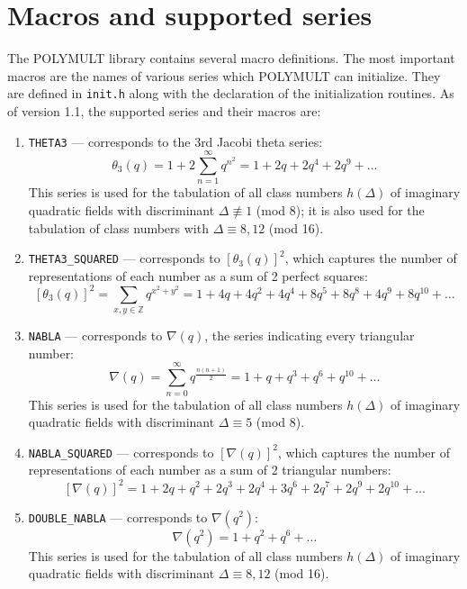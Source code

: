 \documentclass[a4paper,10pt]{article}
\newcommand{\code}{\lstinline}
\begin{document}
\section{Macros and supported series} \label{sec:macros}

The POLYMULT library contains several macro definitions. The most important macros are the names of various series which POLYMULT can initialize. They are defined in \code{init.h} along with the declaration of the initialization routines. As of version 1.1, the supported series and their macros are:
\begin{enumerate}
\item \code{THETA3} --- corresponds to the 3rd Jacobi theta series:
%
$$
\theta_3(q) = 1 + 2\sum\limits_{n=1}^\infty q^{n^2} = 1 + 2q + 2q^4 + 2q^9 + \ldots
$$
%
This series is used for the tabulation of all class numbers $h(\Delta)$ of imaginary quadratic fields with discriminant $\Delta \not \equiv 1$ (mod 8); it is also used for the tabulation of class numbers with $\Delta \equiv 8, 12$ (mod 16).

\item \code{THETA3_SQUARED} --- corresponds to $\left[\theta_3(q)\right]^2$, which captures the number of representations of each number as a sum of 2 perfect squares:
%
$$
\left[\theta_3(q)\right]^2 = \sum\limits_{x, y \in \mathbb Z}q^{x^2+y^2} = 1 + 4q + 4q^2 + 4q^4 + 8q^5 + 8q^8 + 4q^9 + 8q^{10} + \ldots
$$

\item \code{NABLA} --- corresponds to $\nabla(q)$, the series indicating every triangular number:
%
$$
\nabla(q) = \sum\limits_{n = 0}^\infty q^{\frac{n(n+1)}{2}} = 1 + q + q^3 + q^6 + q^{10} + \ldots 
$$
%
This series is used for the tabulation of all class numbers $h(\Delta)$ of imaginary quadratic fields with discriminant $\Delta \equiv 5$ (mod 8).

\item \code{NABLA_SQUARED} --- corresponds to $\left[\nabla(q)\right]^2$, which captures the number of representations of each number as a sum of 2 triangular numbers:
%
$$
\left[\nabla(q)\right]^2 = 1 + 2q + q^2 + 2q^3 + 2q^4 + 3q^6 + 2q^7 + 2q^9 + 2q^{10} + \ldots
$$

\item \code{DOUBLE_NABLA} --- corresponds to $\nabla(q^2)$:
%
$$
\nabla(q^2) = 1 + q^2 + q^6 + \ldots
$$
%
This series is used for the tabulation of all class numbers $h(\Delta)$ of imaginary quadratic fields with discriminant $\Delta \equiv 8, 12$ (mod 16).


\end{enumerate}
\end{document}
